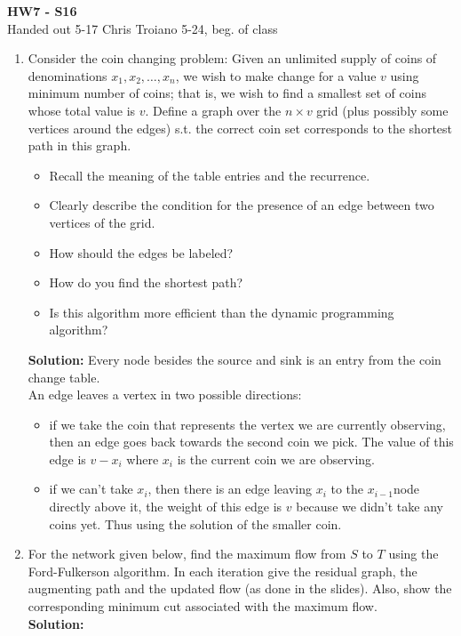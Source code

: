 \documentclass[11pt]{article}
\begin{document}
\begin{center}
{\bf\large HW7 - S16}\\
Handed out 5-17 \hfill Chris Troiano \hfill 5-24, beg.
of class \\
\end{center}

\begin{enumerate}
\item 
Consider the coin changing problem:
Given an unlimited supply of coins of denominations 
$x_1, x_2,\ldots, x_n$, we wish to make change for a value $v$ using
minimum number of coins; that
is, we wish to find a smallest set of coins whose total value is $v$. 
Define a graph over the $n\times v$ grid (plus possibly some
vertices around the edges) s.t. the correct coin set corresponds to
the shortest path in this graph. 
\begin{itemize}
\item Recall the meaning of the table entries and the
recurrence.
\item Clearly describe the condition for the presence of an
  edge between two vertices of the grid.
\item How should the edges be labeled?
\item How do you find the shortest path?
\item Is this algorithm more efficient than the dynamic
  programming algorithm?
\end{itemize}
\textbf{Solution:}
Every node besides the source and sink is an entry from the coin change table.\\
An edge leaves a vertex in two possible directions: 
\begin{itemize}
\item
if we take the coin that represents the vertex we are currently observing, then an edge goes back towards the second coin we pick. The value of this edge is $v-x_i$ where $x_i$ is the current coin we are observing. 
\item
if we can't take $x_i$, then there is an edge leaving $x_i$ to the $x_{i-1}$node directly above it, the weight of this edge is $v$ because we didn't take any coins yet. Thus using the solution of the smaller coin.

\end{itemize}
\vspace*{3cm}

\item For the network given below, find the maximum flow from $S$ to
  $T$ using the Ford-Fulkerson algorithm. In each iteration
give the residual graph, the augmenting path and the
updated flow (as done in the slides). 
Also, show the corresponding minimum cut
associated with the maximum flow.\\
\textbf{Solution:}


\end{enumerate}
\end{document}
